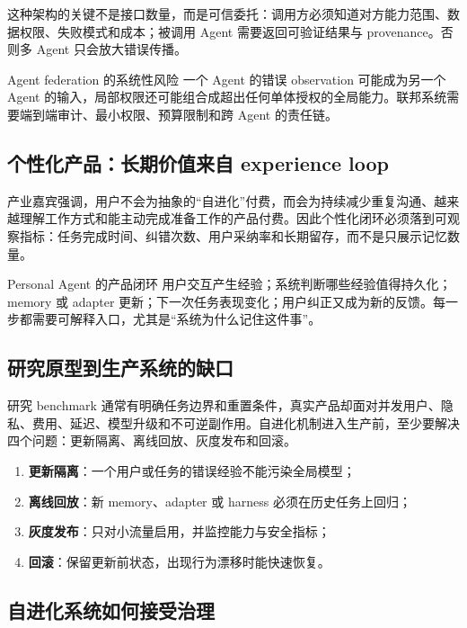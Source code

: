这种架构的关键不是接口数量，而是可信委托：调用方必须知道对方能力范围、数据权限、失败模式和成本；被调用 Agent 需要返回可验证结果与 provenance。否则多 Agent 只会放大错误传播。

\begin{warningbox}{Agent federation 的系统性风险}
一个 Agent 的错误 observation 可能成为另一个 Agent 的输入，局部权限还可能组合成超出任何单体授权的全局能力。联邦系统需要端到端审计、最小权限、预算限制和跨 Agent 的责任链。
\end{warningbox}

\subsection{个性化产品：长期价值来自 experience loop}

产业嘉宾强调，用户不会为抽象的“自进化”付费，而会为持续减少重复沟通、越来越理解工作方式和能主动完成准备工作的产品付费。因此个性化闭环必须落到可观察指标：任务完成时间、纠错次数、用户采纳率和长期留存，而不是只展示记忆数量。

\begin{importantbox}{Personal Agent 的产品闭环}
用户交互产生经验；系统判断哪些经验值得持久化；memory 或 adapter 更新；下一次任务表现变化；用户纠正又成为新的反馈。每一步都需要可解释入口，尤其是“系统为什么记住这件事”。
\end{importantbox}

\subsection{研究原型到生产系统的缺口}

研究 benchmark 通常有明确任务边界和重置条件，真实产品却面对并发用户、隐私、费用、延迟、模型升级和不可逆副作用。自进化机制进入生产前，至少要解决四个问题：更新隔离、离线回放、灰度发布和回滚。

\begin{enumerate}
    \item \textbf{更新隔离}：一个用户或任务的错误经验不能污染全局模型；
    \item \textbf{离线回放}：新 memory、adapter 或 harness 必须在历史任务上回归；
    \item \textbf{灰度发布}：只对小流量启用，并监控能力与安全指标；
    \item \textbf{回滚}：保留更新前状态，出现行为漂移时能快速恢复。
\end{enumerate}

\subsection{自进化系统如何接受治理}

